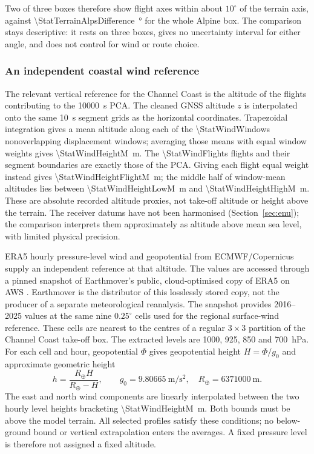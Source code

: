 Two of three boxes therefore show flight axes within about $10^\circ$ of the terrain
axis, against \SI{\StatTerrainAlpsDifference}{\degree} for the whole Alpine box. The
comparison stays descriptive: it rests on three boxes, gives no uncertainty interval
for either angle, and does not control for wind or route choice.

\subsubsection{An independent coastal wind reference}
\label{sec:independent-coastal-wind}

The relevant vertical reference for the Channel Coast is the altitude of the
flights contributing to the \SI{10000}{\second} PCA. The cleaned GNSS altitude
$z$ is interpolated onto the same \SI{10}{\second} segment grids as the horizontal
coordinates. Trapezoidal integration gives a mean altitude along each of the
\num{\StatWindWindows} nonoverlapping displacement windows; averaging those
means with equal window weights gives \SI{\StatWindHeightM}{\metre}. The
\num{\StatWindFlights} flights and their segment boundaries are exactly those
of the PCA. Giving each flight equal weight instead gives
\SI{\StatWindHeightFlightM}{\metre}; the middle half of window-mean altitudes
lies between \SI{\StatWindHeightLowM}{\metre} and
\SI{\StatWindHeightHighM}{\metre}. These are absolute recorded altitude proxies,
not take-off altitude or height above the terrain. The receiver datums have
not been harmonised (Section~\ref{sec:enu}); the comparison interprets them
approximately as altitude above mean sea level, with limited physical precision.

ERA5 hourly pressure-level wind and geopotential from ECMWF/Copernicus
\cite{era5_pressure} supply an independent reference at that altitude. The
values are accessed through a pinned snapshot of Earthmover's public,
cloud-optimised copy of ERA5 on AWS \cite{earthmover_era5}. Earthmover is the
distributor of this losslessly stored copy, not the producer of a separate
meteorological reanalysis. The snapshot provides 2016--2025 values at the same
nine $0.25^\circ$ cells used for the regional surface-wind reference. These
cells are nearest to the centres of a regular $3\times3$ partition of the
Channel Coast take-off box. The extracted levels are 1000, 925, 850 and
\SI{700}{\hecto\pascal}. For each cell and hour, geopotential $\Phi$ gives
geopotential height $H=\Phi/g_0$ and approximate geometric height
\cite{ecmwf_geopotential_height}
\begin{equation}
 h=\frac{R_\oplus H}{R_\oplus-H},\qquad
 g_0=\SI[group-digits=false]{9.80665}{\metre\per\second\squared},\quad
 R_\oplus=\SI{6371000}{\metre}.
 \label{eq:wind-level-height}
\end{equation}
The east and north wind components are linearly interpolated between the two
hourly level heights bracketing \SI{\StatWindHeightM}{\metre}. Both bounds
must be above the model terrain. All selected profiles satisfy these conditions;
no below-ground bound or vertical extrapolation enters the averages. A fixed
pressure level is therefore not assigned a fixed altitude.

